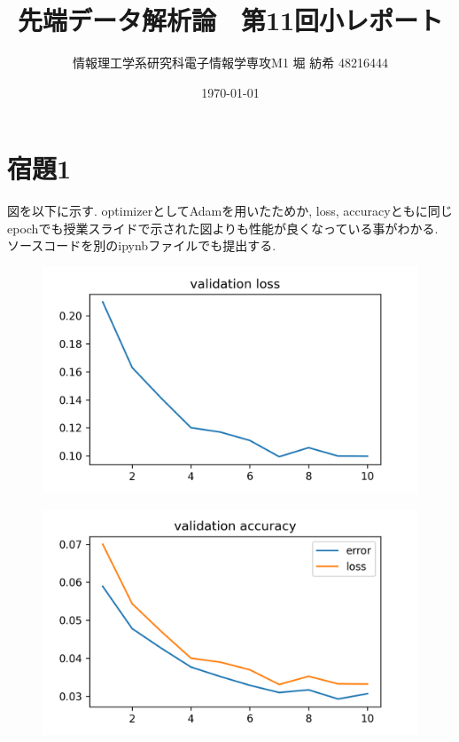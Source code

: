\documentclass[a4paper,11pt]{jsarticle}
\begin{document}
  \title{先端データ解析論　第11回小レポート}
  \author{情報理工学系研究科電子情報学専攻M1 堀 紡希 48216444}
  \date{\today}
  \maketitle
  \section*{宿題1}
  図を以下に示す.
  optimizerとしてAdamを用いたためか, loss, accuracyともに同じepochでも授業スライドで示された図よりも性能が良くなっている事がわかる.
  ソースコードを別のipynbファイルでも提出する.
  \begin{figure}[H]
    \centering
    \includegraphics{loss.png}
  \end{figure}

  \begin{figure}[H]
    \centering
    \includegraphics{accuracy.png}
  \end{figure}
\end{document}
